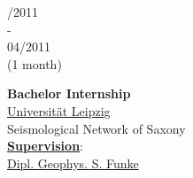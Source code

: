 \documentclass{article}
\begin{document}
\begin{minipage}[t]{0.7\textwidth}
\begin{minipage}[t]{0.45\textwidth}
		\vspace{0.3cm}
		
		
		\begin{minipage}[t]{0.25\textwidth}
		/2011\\ - \\ 04/2011\\(1 month)
		\end{minipage}		
		\hfill
		\begin{minipage}[t]{0.75\textwidth}
		\textbf{Bachelor Internship}\\
		\href{http://geologie.physgeo.uni-leipzig.de}{\color{pblue}Universität Leipzig}\\
	    Seismological Network of Saxony\\ 
	     \textbf{\underline{Supervision}}: \\
	     \href{mailto:sfunke@rz.uni-leipzig.de}{Dipl. Geophys. S. Funke}
		\end{minipage}
		
		\end{minipage}		
\end{minipage}
\end{document}
